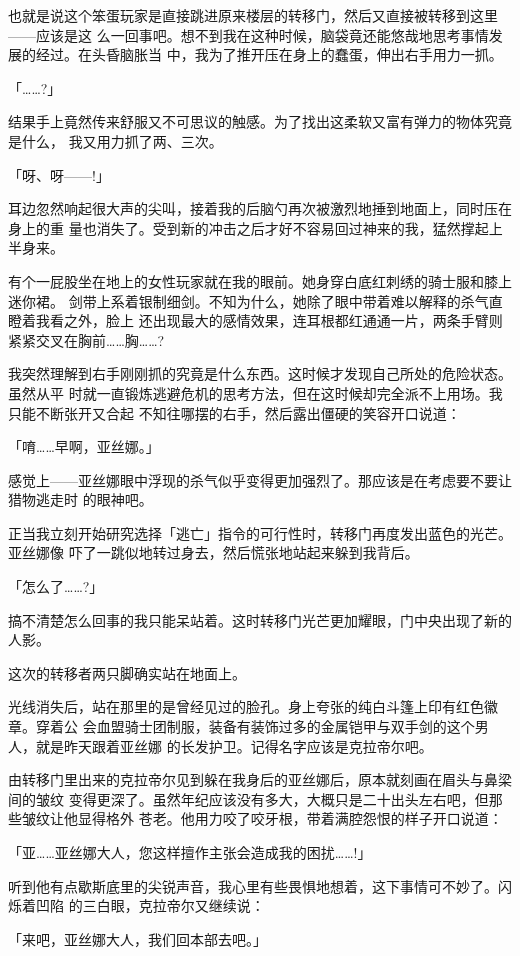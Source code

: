 \documentclass[11pt]{book}
\begin{document}
也就是说这个笨蛋玩家是直接跳进原来楼层的转移门，然后又直接被转移到这里——应该是这
么一回事吧。想不到我在这种时候，脑袋竟还能悠哉地思考事情发展的经过。在头昏脑胀当
中，我为了推开压在身上的蠢蛋，伸出右手用力一抓。

「……?」

结果手上竟然传来舒服又不可思议的触感。为了找出这柔软又富有弹力的物体究竟是什么，
我又用力抓了两、三次。

「呀、呀——!」

耳边忽然响起很大声的尖叫，接着我的后脑勺再次被激烈地捶到地面上，同时压在身上的重
量也消失了。受到新的冲击之后才好不容易回过神来的我，猛然撑起上半身来。

有个一屁股坐在地上的女性玩家就在我的眼前。她身穿白底红刺绣的骑士服和膝上迷你裙。
剑带上系着银制细剑。不知为什么，她除了眼中带着难以解释的杀气直瞪着我看之外，脸上
还出现最大的感情效果，连耳根都红通通一片，两条手臂则紧紧交叉在胸前……胸……?

我突然理解到右手刚刚抓的究竟是什么东西。这时候才发现自己所处的危险状态。虽然从平
时就一直锻炼逃避危机的思考方法，但在这时候却完全派不上用场。我只能不断张开又合起
不知往哪摆的右手，然后露出僵硬的笑容开口说道：

「唷……早啊，亚丝娜。」

感觉上——亚丝娜眼中浮现的杀气似乎变得更加强烈了。那应该是在考虑要不要让猎物逃走时
的眼神吧。

正当我立刻开始研究选择「逃亡」指令的可行性时，转移门再度发出蓝色的光芒。亚丝娜像
吓了一跳似地转过身去，然后慌张地站起来躲到我背后。

「怎么了……?」

搞不清楚怎么回事的我只能呆站着。这时转移门光芒更加耀眼，门中央出现了新的人影。

这次的转移者两只脚确实站在地面上。

光线消失后，站在那里的是曾经见过的脸孔。身上夸张的纯白斗篷上印有红色徽章。穿着公
会血盟骑士团制服，装备有装饰过多的金属铠甲与双手剑的这个男人，就是昨天跟着亚丝娜
的长发护卫。记得名字应该是克拉帝尔吧。

由转移门里出来的克拉帝尔见到躲在我身后的亚丝娜后，原本就刻画在眉头与鼻梁间的皱纹
变得更深了。虽然年纪应该没有多大，大概只是二十出头左右吧，但那些皱纹让他显得格外
苍老。他用力咬了咬牙根，带着满腔怨恨的样子开口说道：

「亚……亚丝娜大人，您这样擅作主张会造成我的困扰……!」

听到他有点歇斯底里的尖锐声音，我心里有些畏惧地想着，这下事情可不妙了。闪烁着凹陷
的三白眼，克拉帝尔又继续说：

「来吧，亚丝娜大人，我们回本部去吧。」
\end{document}
